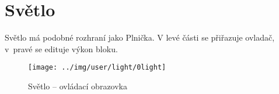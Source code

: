 
\section{Světlo}

Světlo má podobné rozhraní jako Plnička. V levé části se přiřazuje ovladač, v~pravé se edituje výkon bloku.

\begin{figure}[!ht]\centering
\texttt{[image: ../img/user/light/0light]}

\caption{Světlo -- ovládací obrazovka}
\label{fig:user_light_0light}

\end{figure}

\FloatBarrier
